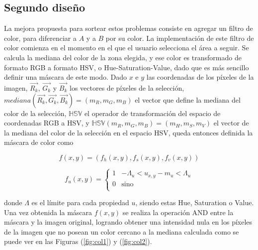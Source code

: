 \subsection{Segundo diseño}

La mejora propuesta para sortear estos problemas consiste en agregar un filtro de color, para diferenciar a $A$ y a $B$ por su color. La implementación de este filtro de color comienza en el momento en el que el usuario selecciona el área a seguir. Se calcula la mediana del color de la zona elegida, y ese color es transformado de formato RGB a formato HSV, o Hue-Saturation-Value, dado que es más sencillo definir una máscara de este modo. Dado $x$ e $y$ las coordenadas de los píxeles de la imagen, $\vec{R_k}$, $\vec{G_k}$ y $\vec{B_k}$ los vectores de píxeles de la selección, $mediana(\vec{R_k}, \vec{G_k}, \vec{B_k}) = (m_R, m_G, m_B)$ el vector que define la mediana del color de la selección, $\mathbb{HSV}$ el operador de transformación del espacio de coordenadas RGB a HSV, y $\mathbb{HSV}(m_R, m_G, m_B) = (m_H, m_S, m_V)$ el vector de la mediana del color de la selección en el espacio HSV, queda entonces definida la máscara de color como

\begin{equation}
f(x, y) = (f_h(x, y), f_s(x, y), f_v(x, y))
\end{equation}

\begin{equation}
f_{u}(x,y) = \left\{
\begin{array}{ll}


      1 & -\Lambda_u < u_{x, y} - m_u < \Lambda_u \\
      
      
      
      0 & \text{sino} \\
      
      
\end{array} 
\right.
\end{equation}

donde $\Lambda$ es el límite para cada propiedad $u$, siendo estas Hue, Saturation o Value. Una vez obtenida la máscara $f(x, y)$ se realiza la operación AND entre la máscara y la imagen original, logrando obtener una intensidad nula en los píxeles de la imagen que no posean un color cercano a la mediana calculada como se puede ver en las Figuras (\ref{fig:col1}) y (\ref{fig:col2}).

